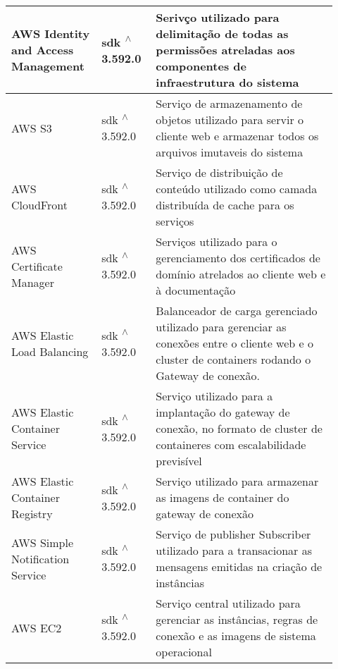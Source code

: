 \begin{longtable}{p{0.25\linewidth} p{0.15\linewidth} p{0.525\linewidth}}
\hline

AWS Identity and Access Management \citep{awsiamdocs} & sdk \textsuperscript{$\wedge$}3.592.0 & Serivço utilizado para delimitação de todas as permissões atreladas aos componentes de infraestrutura do sistema \\

\hline

AWS S3 \citep{awss3docs} & sdk \textsuperscript{$\wedge$}3.592.0 & Serviço de armazenamento de objetos utilizado para servir o cliente web e armazenar todos os arquivos imutaveis do sistema \\

\hline

AWS CloudFront \citep{awscloudfrontdocs} & sdk \textsuperscript{$\wedge$}3.592.0 & Serviço de distribuição de conteúdo utilizado como camada distribuída de cache para os serviços \\

\hline

AWS Certificate Manager \citep{awscertificatemanagerdocs} & sdk \textsuperscript{$\wedge$}3.592.0 & Serviços utilizado para o gerenciamento dos certificados de domínio atrelados ao cliente web e à documentação \\

\hline

AWS Elastic Load Balancing \citep{awselasticloadbalancing} & sdk \textsuperscript{$\wedge$}3.592.0 & Balanceador de carga gerenciado utilizado para gerenciar as conexões entre o cliente web e o cluster de containers rodando o Gateway de conexão. \\

\hline

AWS Elastic Container Service \citep{awsecsdocs} & sdk \textsuperscript{$\wedge$}3.592.0 & Serviço utilizado para a implantação do gateway de conexão, no formato de cluster de containeres com escalabilidade previsível \\

\hline

AWS Elastic Container Registry \citep{awsecrdocs} & sdk \textsuperscript{$\wedge$}3.592.0 & Serviço utilizado para armazenar as imagens de container do gateway de conexão \\

\hline

AWS Simple Notification Service \citep{awssnsdocs} & sdk \textsuperscript{$\wedge$}3.592.0 & Serviço de publisher Subscriber utilizado para a transacionar as mensagens emitidas na criação de instâncias \\

\hline

AWS EC2 \citep{awsec2docs} & sdk \textsuperscript{$\wedge$}3.592.0 & Serviço central utilizado para gerenciar as instâncias, regras de conexão e as imagens de sistema operacional \\

\hline

\end{longtable}

